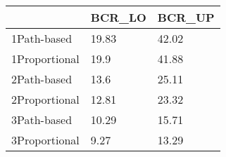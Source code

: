 \begin{tabular}{lll}
& BCR_LO & BCR_UP \\ 
\hline 
1Path-based & 19.83 & 42.02 \\ 
1Proportional & 19.9 & 41.88 \\ 
2Path-based & 13.6 & 25.11 \\ 
2Proportional & 12.81 & 23.32 \\ 
3Path-based & 10.29 & 15.71 \\ 
3Proportional & 9.27 & 13.29 \\ 
\hline 
\end{tabular}